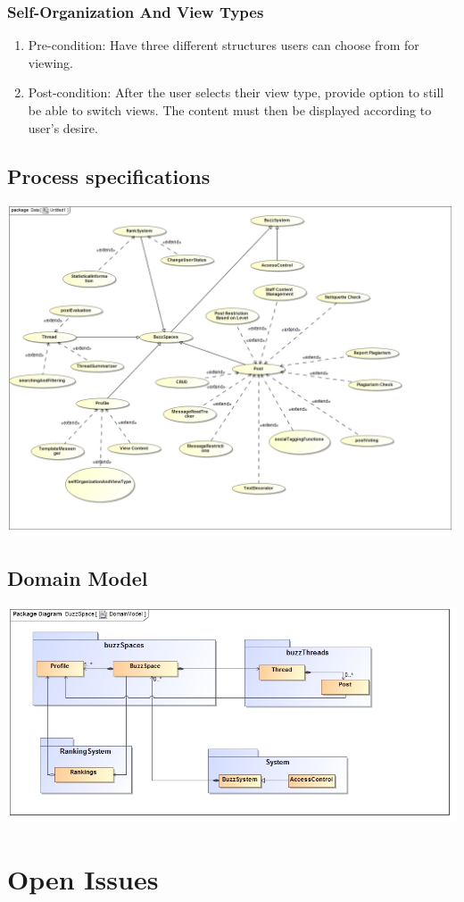 \documentclass[hidelinks, 12pt, oneside]{article}
\begin{document}
\subsubsection{Self-Organization And View Types}
\begin{enumerate}
\item Pre-condition: Have three different structures users can choose from for viewing.
\item Post-condition: After the user selects their view type, provide option to still be able to switch views. The content must then be displayed according to user's desire.
\end{enumerate}

\subsection{Process specifications}
 \centerline{\includegraphics[scale=0.48]{ProcessSpecification}}
 \newpage
\subsection{Domain Model}
 \centerline{\includegraphics[scale=0.4]{DomainModel}}
\section{Open Issues}
\end{document}

